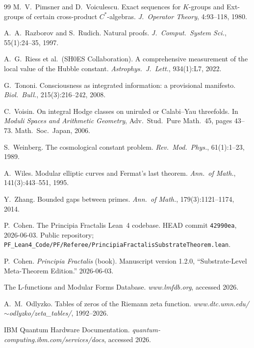 \documentclass[11pt,a4paper]{article}
\theoremstyle{definition}
\theoremstyle{remark}
\begin{document}
\begin{thebibliography}{99}
M.\ V.\ Pimsner and D.\ Voiculescu.
\newblock Exact sequences for $K$-groups and Ext-groups of certain
cross-product $C^{*}$-algebras.
\newblock \emph{J.\ Operator Theory}, 4:93--118, 1980.

A.\ A.\ Razborov and S.\ Rudich.
\newblock Natural proofs.
\newblock \emph{J.\ Comput.\ System Sci.}, 55(1):24--35, 1997.

A.\ G.\ Riess et al.\ (SH0ES Collaboration).
\newblock A comprehensive measurement of the local value of the
Hubble constant.
\newblock \emph{Astrophys.\ J.\ Lett.}, 934(1):L7, 2022.

G.\ Tononi.
\newblock Consciousness as integrated information: a provisional
manifesto.
\newblock \emph{Biol.\ Bull.}, 215(3):216--242, 2008.

C.\ Voisin.
\newblock On integral Hodge classes on uniruled or Calabi--Yau
threefolds.
\newblock In \emph{Moduli Spaces and Arithmetic Geometry}, Adv.\
Stud.\ Pure Math.\ 45, pages 43--73. Math.\ Soc.\ Japan, 2006.

S.\ Weinberg.
\newblock The cosmological constant problem.
\newblock \emph{Rev.\ Mod.\ Phys.}, 61(1):1--23, 1989.

A.\ Wiles.
\newblock Modular elliptic curves and Fermat's last theorem.
\newblock \emph{Ann.\ of Math.}, 141(3):443--551, 1995.

Y.\ Zhang.
\newblock Bounded gaps between primes.
\newblock \emph{Ann.\ of Math.}, 179(3):1121--1174, 2014.

P.\ Cohen.
\newblock The Principia Fractalis Lean~4 codebase.
\newblock HEAD commit \texttt{42990ea}, 2026-06-03.
\newblock Public repository; \texttt{PF\_Lean4\_Code/PF/Referee/PrincipiaFractalisSubstrateTheorem.lean}.

P.\ Cohen.
\newblock \emph{Principia Fractalis} (book).
\newblock Manuscript version 1.2.0, ``Substrate-Level Meta-Theorem
Edition.'' 2026-06-03.

The L-functions and Modular Forms Database.
\newblock \emph{www.lmfdb.org}, accessed 2026.

A.\ M.\ Odlyzko.
\newblock Tables of zeros of the Riemann zeta function.
\newblock \emph{www.dtc.umn.edu/$\sim$odlyzko/zeta\_tables/}, 1992--2026.

IBM Quantum Hardware Documentation.
\newblock \emph{quantum-computing.ibm.com/services/docs}, accessed 2026.

\end{thebibliography}
\end{document}
